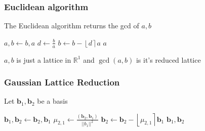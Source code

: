 \documentclass{beamer}
\newcommand{\vabs}[1]{\left|\left|#1\right|\right|}
\newcommand{\bv}{\mathbf b}
\begin{document}
\begin{frame}
    \frametitle{Euclidean algorithm}
    The Euclidean algorithm returns the gcd of $a,b$

    \begin{algorithmic}
        \STATE $a,b\leftarrow b,a$
        \ENDIF
        \STATE $d\leftarrow\frac{b}{a}$
        \STATE $b\leftarrow b-\left\lfloor d\right\rceil a$
        \ENDWHILE
        \RETURN $a$
    \end{algorithmic}

    $a,b$ is just a lattice in $\mathbb R^1$ and $\gcd(a,b)$ is it's reduced lattice
\end{frame}

\begin{frame}
    \frametitle{Gaussian Lattice Reduction}
    Let $\bv_1,\bv_2$ be a basis

    \begin{algorithmic}
        \IF{$\vabs{\bv_1}>\vabs{\bv_2}$}
        \STATE $\bv_1,\bv_2\leftarrow\bv_2,\bv_1$
        \ENDIF
        \STATE $\mu_{2,1}\leftarrow\frac{\left(\bv_2,\bv_1\right)}{\vabs{b_1}^2}$
        \STATE $\bv_2\leftarrow\bv_2-\left\lfloor\mu_{2,1}\right\rceil\bv_1$
        \ENDWHILE
        \RETURN $\bv_1,\bv_2$
    \end{algorithmic}
\end{frame}
\end{document}
